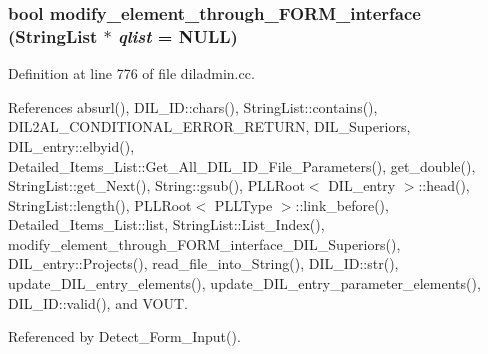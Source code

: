 \subsubsection{\setlength{\rightskip}{0pt plus 5cm}bool modify\_\-element\_\-through\_\-FORM\_\-interface ({\bf String\-List} $\ast$ {\em qlist} = NULL)}\label{diladmin_8cc_a12}




Definition at line 776 of file diladmin.cc.

References absurl(), DIL\_\-ID::chars(), String\-List::contains(), DIL2AL\_\-CONDITIONAL\_\-ERROR\_\-RETURN, DIL\_\-Superiors, DIL\_\-entry::elbyid(), Detailed\_\-Items\_\-List::Get\_\-All\_\-DIL\_\-ID\_\-File\_\-Parameters(), get\_\-double(), String\-List::get\_\-Next(), String::gsub(), PLLRoot$<$ DIL\_\-entry $>$::head(), String\-List::length(), PLLRoot$<$ PLLType $>$::link\_\-before(), Detailed\_\-Items\_\-List::list, String\-List::List\_\-Index(), modify\_\-element\_\-through\_\-FORM\_\-interface\_\-DIL\_\-Superiors(), DIL\_\-entry::Projects(), read\_\-file\_\-into\_\-String(), DIL\_\-ID::str(), update\_\-DIL\_\-entry\_\-elements(), update\_\-DIL\_\-entry\_\-parameter\_\-elements(), DIL\_\-ID::valid(), and VOUT.

Referenced by Detect\_\-Form\_\-Input().



